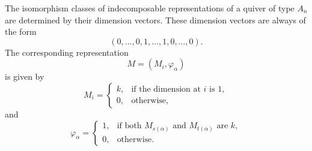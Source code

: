 \documentclass[11pt, a4paper]{report}
\begin{document}
    \begin{remark}
    The isomorphism classes of indecomposable representations of a quiver of type
    \(A_n\) are determined by their dimension vectors. These dimension vectors are
    always of the form
    \[
        (0,\dots,0,1,\dots,1,0,\dots,0).
    \]
    The corresponding representation
    \[
        M=(M_i,\varphi_\alpha)
    \]
    is given by
    \[
        M_i=
        \begin{cases}
            k, & \text{if the dimension at } i \text{ is }1,\\
            0, & \text{otherwise,}
        \end{cases}
    \]
    and
    \[
        \varphi_\alpha=
        \begin{cases}
            1, & \text{if both }M_{s(\alpha)}\text{ and }M_{t(\alpha)}
            \text{ are }k,\\
            0, & \text{otherwise.}
        \end{cases}
    \]
    \end{remark}
\end{document}
